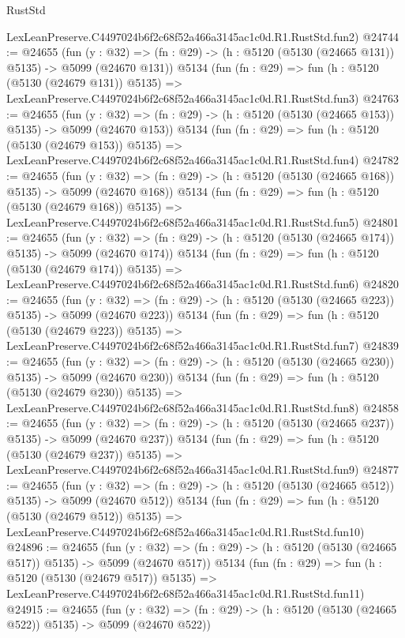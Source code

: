 \begin{lexlean}{RustStd}
\begin{coremodule}
    LexLeanPreserve.C4497024b6f2c68f52a466a3145ac1c0d.R1.RustStd.fun2)
@24744 := @24655
    (fun (y : @32) => (fn : @29) -> (h : @5120 (@5130 (@24665 @131)) @5135) -> @5099 (@24670 @131))
    @5134
    (fun (fn : @29) =>
    fun (h : @5120 (@5130 (@24679 @131)) @5135) =>
    LexLeanPreserve.C4497024b6f2c68f52a466a3145ac1c0d.R1.RustStd.fun3)
@24763 := @24655
    (fun (y : @32) => (fn : @29) -> (h : @5120 (@5130 (@24665 @153)) @5135) -> @5099 (@24670 @153))
    @5134
    (fun (fn : @29) =>
    fun (h : @5120 (@5130 (@24679 @153)) @5135) =>
    LexLeanPreserve.C4497024b6f2c68f52a466a3145ac1c0d.R1.RustStd.fun4)
@24782 := @24655
    (fun (y : @32) => (fn : @29) -> (h : @5120 (@5130 (@24665 @168)) @5135) -> @5099 (@24670 @168))
    @5134
    (fun (fn : @29) =>
    fun (h : @5120 (@5130 (@24679 @168)) @5135) =>
    LexLeanPreserve.C4497024b6f2c68f52a466a3145ac1c0d.R1.RustStd.fun5)
@24801 := @24655
    (fun (y : @32) => (fn : @29) -> (h : @5120 (@5130 (@24665 @174)) @5135) -> @5099 (@24670 @174))
    @5134
    (fun (fn : @29) =>
    fun (h : @5120 (@5130 (@24679 @174)) @5135) =>
    LexLeanPreserve.C4497024b6f2c68f52a466a3145ac1c0d.R1.RustStd.fun6)
@24820 := @24655
    (fun (y : @32) => (fn : @29) -> (h : @5120 (@5130 (@24665 @223)) @5135) -> @5099 (@24670 @223))
    @5134
    (fun (fn : @29) =>
    fun (h : @5120 (@5130 (@24679 @223)) @5135) =>
    LexLeanPreserve.C4497024b6f2c68f52a466a3145ac1c0d.R1.RustStd.fun7)
@24839 := @24655
    (fun (y : @32) => (fn : @29) -> (h : @5120 (@5130 (@24665 @230)) @5135) -> @5099 (@24670 @230))
    @5134
    (fun (fn : @29) =>
    fun (h : @5120 (@5130 (@24679 @230)) @5135) =>
    LexLeanPreserve.C4497024b6f2c68f52a466a3145ac1c0d.R1.RustStd.fun8)
@24858 := @24655
    (fun (y : @32) => (fn : @29) -> (h : @5120 (@5130 (@24665 @237)) @5135) -> @5099 (@24670 @237))
    @5134
    (fun (fn : @29) =>
    fun (h : @5120 (@5130 (@24679 @237)) @5135) =>
    LexLeanPreserve.C4497024b6f2c68f52a466a3145ac1c0d.R1.RustStd.fun9)
@24877 := @24655
    (fun (y : @32) => (fn : @29) -> (h : @5120 (@5130 (@24665 @512)) @5135) -> @5099 (@24670 @512))
    @5134
    (fun (fn : @29) =>
    fun (h : @5120 (@5130 (@24679 @512)) @5135) =>
    LexLeanPreserve.C4497024b6f2c68f52a466a3145ac1c0d.R1.RustStd.fun10)
@24896 := @24655
    (fun (y : @32) => (fn : @29) -> (h : @5120 (@5130 (@24665 @517)) @5135) -> @5099 (@24670 @517))
    @5134
    (fun (fn : @29) =>
    fun (h : @5120 (@5130 (@24679 @517)) @5135) =>
    LexLeanPreserve.C4497024b6f2c68f52a466a3145ac1c0d.R1.RustStd.fun11)
@24915 := @24655
    (fun (y : @32) => (fn : @29) -> (h : @5120 (@5130 (@24665 @522)) @5135) -> @5099 (@24670 @522))

\end{coremodule}
\end{lexlean}
